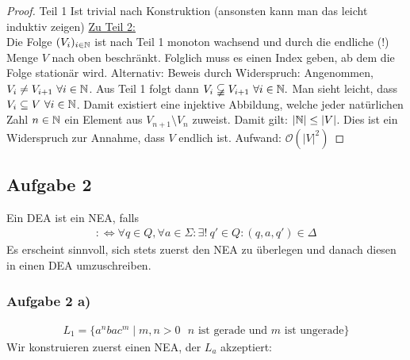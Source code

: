 \begin{proof}
	Teil 1 Ist trivial nach Konstruktion (ansonsten kann man das leicht induktiv zeigen)\nl
	\ul{Zu Teil 2:}\\
	Die Folge $(V_i)_{i\in\mathbb{N}}$ ist nach Teil 1 monoton wachsend und durch die endliche (!) Menge $V$ nach oben beschränkt. 
	Folglich muss es einen Index geben, ab dem die Folge stationär wird.\nl
	Alternativ: Beweis durch Widerspruch: Angenommen, $V_i\neq V_{i+1}~\forall i\in\mathbb{N}$. 
	Aus Teil 1 folgt dann $V_i\varsubsetneqq V_{i+1}~\forall i\in\mathbb{N}.$ 
	Man sieht leicht, dass $V_i\subseteq V~\forall i\in\mathbb{N}$. 
	Damit existiert eine injektive Abbildung, welche jeder natürlichen Zahl $n\in\mathbb{N}$ ein Element aus $V_{n+1}\setminus V_n$ zuweist. 
	Damit gilt: $|\mathbb{N}|\leq |V|$. Dies ist ein Widerspruch zur Annahme, dass $V$ endlich ist.\nl
	Aufwand: $\mathcal{O}(|V|^2)$ %
\end{proof}

\subsection{Aufgabe 2}
Ein DEA ist ein NEA, falls
\begin{align*}
	:\Longleftrightarrow\forall q\in Q,\forall a\in\Sigma:\exists!~q'\in Q:(q,a,q')\in\Delta
\end{align*}
Es erscheint sinnvoll, sich stets zuerst den NEA zu überlegen und danach diesen in einen DEA umzuschreiben.

\subsubsection{Aufgabe 2 a)}
\begin{align*}
	L_1=\big\lbrace a^n bac^m\mid m,n>0\text{ $n$ ist gerade und $m$ ist ungerade}\big\rbrace
\end{align*}
Wir konstruieren zuerst einen NEA, der $L_a$ akzeptiert:\\

\usetikzlibrary{positioning,automata}

